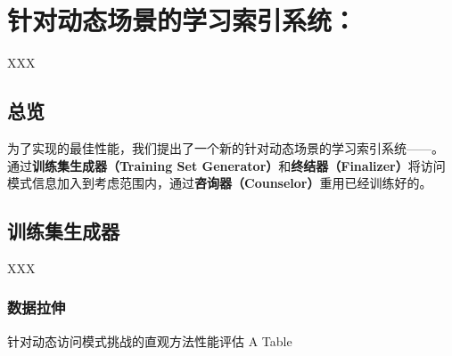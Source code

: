 \chapter{针对动态场景的学习索引系统：\sys}
\label{chap:sys}

XXX

\section{总览}

为了实现{\li}的最佳性能，我们提出了一个新的针对动态场景的学习索引系统{------}{\sys}。
{\sys}通过\textbf{训练集生成器（Training Set Generator）}和\textbf{终结器（Finalizer）}将访问模式信息加入到考虑范围内，通过\textbf{咨询器（Counselor）}重用已经训练好的{\model}。


\section{训练集生成器}

XXX

\subsection{数据拉伸}

\begin{table}[!hpb]
  \centering
  \bicaption[指向一个表格的表目录索引]
    {针对动态访问模式挑战的直观方法性能评估}
    {A Table}
  \label{tab:pattern-int-sol}
  \begin{tabular}{@{}llr@{}} \toprule
  \end{tabular}
\end{table}

